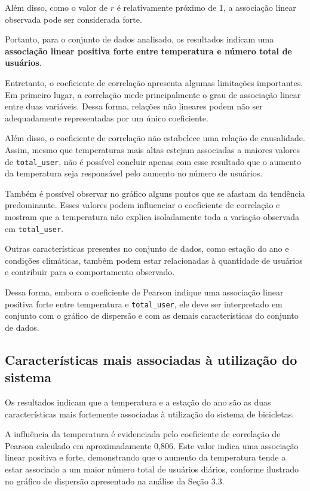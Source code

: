 \documentclass[12pt,a4paper]{article}
\begin{document}
Além disso, como o valor de $r$ é relativamente próximo de 1, a associação linear observada pode ser considerada forte.

Portanto, para o conjunto de dados analisado, os resultados indicam uma \textbf{associação linear positiva forte entre temperatura e número total de usuários}.

Entretanto, o coeficiente de correlação apresenta algumas limitações importantes. Em primeiro lugar, a correlação mede principalmente o grau de associação linear entre duas variáveis. Dessa forma, relações não lineares podem não ser adequadamente representadas por um único coeficiente.

Além disso, o coeficiente de correlação não estabelece uma relação de causalidade. Assim, mesmo que temperaturas mais altas estejam associadas a maiores valores de \texttt{total\_user}, não é possível concluir apenas com esse resultado que o aumento da temperatura seja responsável pelo aumento no número de usuários.

Também é possível observar no gráfico alguns pontos que se afastam da tendência predominante. Esses valores podem influenciar o coeficiente de correlação e mostram que a temperatura não explica isoladamente toda a variação observada em \texttt{total\_user}.

Outras características presentes no conjunto de dados, como estação do ano e condições climáticas, também podem estar relacionadas à quantidade de usuários e contribuir para o comportamento observado.

Dessa forma, embora o coeficiente de Pearson indique uma associação linear positiva forte entre temperatura e \texttt{total\_user}, ele deve ser interpretado em conjunto com o gráfico de dispersão e com as demais características do conjunto de dados.

\subsection{Características mais associadas à utilização do sistema}

Os resultados indicam que a temperatura e a estação do ano são as duas características mais fortemente associadas à utilização do sistema de bicicletas.

A influência da temperatura é evidenciada pelo coeficiente de correlação de Pearson calculado em aproximadamente 0,806. Este valor indica uma associação linear positiva e forte, demonstrando que o aumento da temperatura tende a estar associado a um maior número total de usuários diários, conforme ilustrado no gráfico de dispersão apresentado na análise da Seção 3.3.
\end{document}
